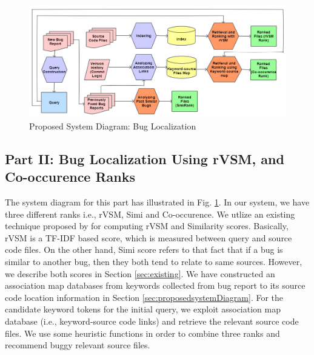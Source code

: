 \documentclass{sig-alternate}
\begin{document}
\begin{figure}
	\centering
	\includegraphics[scale=0.75]{SD1}
	\caption{Proposed System Diagram: Bug Localization}
	\label{fig:BL}
\end{figure}

\subsection{Part II: Bug Localization Using rVSM, and Co-occurence Ranks}

The system diagram for this part has illustrated in Fig. \ref{fig:BL}.
In our system, we have three different ranks i.e., rVSM, Simi and Co-occurence. We utlize an existing technique proposed by \citet{Jian} for computing rVSM and Similarity scores. Basically, rVSM is a TF-IDF based score, which is measured between query and source code files.
On the other hand, Simi score refers to that fact that if a bug is similar to another bug, then they both tend to relate to same sources. However, we describe both scores in Section \ref{sec:existing}.
We have constructed an association map databases from keywords collected from bug report to its source code location information in Section \ref{sec:proposedsystemDiagram}.
For the candidate keyword tokens for the initial query, we exploit association map database (i.e., keyword-source code links) and retrieve the relevant source code files. We use some heuristic functions in order to combine three ranks and recommend buggy relevant source files.  

\end{document}
